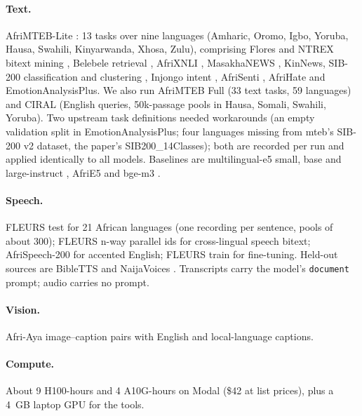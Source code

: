 \documentclass[11pt]{article}
\begin{document}
\paragraph{Text.}
AfriMTEB-Lite \citep{uemura2026afrimteb}: 13 tasks over nine languages
(Amharic, Oromo, Igbo, Yoruba, Hausa, Swahili, Kinyarwanda, Xhosa, Zulu),
comprising Flores and NTREX bitext mining \citep{nllb2022,federmann2022ntrex},
Belebele retrieval \citep{bandarkar2024belebele}, AfriXNLI
\citep{adelani2024irokobench}, MasakhaNEWS \citep{adelani2023masakhanews},
KinNews, SIB-200 classification and clustering \citep{adelani2024sib200},
Injongo intent \citep{yu2025injongo}, AfriSenti \citep{muhammad2023afrisenti},
AfriHate \citep{muhammad2025afrihate} and EmotionAnalysisPlus. We also run
AfriMTEB Full (33 text tasks, 59 languages) and CIRAL \citep{adeyemi2024ciral}
(English queries, 50k-passage pools in Hausa, Somali, Swahili, Yoruba). Two
upstream task definitions needed workarounds (an empty validation split in
EmotionAnalysisPlus; four languages missing from mteb's SIB-200 v2 dataset, the paper's SIB200\_14Classes); both
are recorded per run and applied identically to all models. Baselines are
multilingual-e5 small, base and large-instruct \citep{wang2024multilinguale5},
AfriE5 \citep{uemura2026afrimteb} and bge-m3 \citep{chen2024bgem3}.

\paragraph{Speech.}
FLEURS \citep{conneau2023fleurs} test for 21 African languages (one recording
per sentence, pools of about 300); FLEURS n-way parallel ids for cross-lingual
speech bitext; AfriSpeech-200 \citep{olatunji2023afrispeech} for accented
English; FLEURS train for fine-tuning. Held-out sources are BibleTTS
\citep{meyer2022bibletts} and NaijaVoices \citep{naijavoices2025}. Transcripts
carry the model's \texttt{document} prompt; audio carries no prompt.

\paragraph{Vision.}
Afri-Aya \citep{afriaya2025} image--caption pairs with English and
local-language captions.

\paragraph{Compute.}
About 9 H100-hours and 4 A10G-hours on Modal (\$42 at list prices),
plus a 4~GB laptop GPU for the tools.
\end{document}
